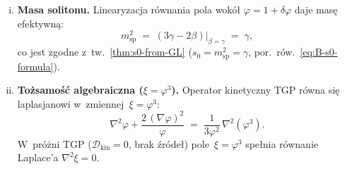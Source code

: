 \begin{proposition}[Substrat z~geometrycznym sprz\k{e}\.zeniem;
  $\alpha = 2$ i~$\beta = \gamma$]
\begin{enumerate}[(i)]
  \item \textbf{Masa solitonu.}
    Linearyzacja r\'ownania pola wok\'o\l{} $\varphi = 1 + \delta\varphi$
    daje mas\k{e} efektywn\k{a}:
    \begin{equation}\label{eq:msp-geo}
      m_{\mathrm{sp}}^2
      \;=\; (3\gamma - 2\beta)\big|_{\beta=\gamma}
      \;=\; \gamma,
    \end{equation}
    co jest zgodne z~tw.~\ref{thm:s0-from-GL}
    ($s_0 = m_{\mathrm{sp}}^2 = \gamma$, por.\ r\'ow.~\eqref{eq:B-s0-formula}).

  \item \textbf{To\.zsamo\'s\'c algebraiczna ($\xi = \varphi^3$).}
    Operator kinetyczny TGP r\'owna si\k{e} laplasjanowi
    w~zmiennej~$\xi = \varphi^3$:
    \begin{equation}\label{eq:phi3-identity}
      \boxed{
        \nabla^2\varphi + \frac{2\,(\nabla\varphi)^2}{\varphi}
        \;=\; \frac{1}{3\varphi^2}\,\nabla^2(\varphi^3).
      }
    \end{equation}
    W~pr\'o\.zni TGP ($\mathcal{D}_{\mathrm{kin}} = 0$, brak \'zr\'ode\l{})
    pole~$\xi = \varphi^3$ spe\l{}nia r\'ownanie Laplace'a
    $\nabla^2\xi = 0$.
\end{enumerate}
\end{proposition}

